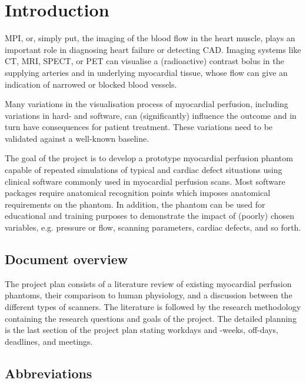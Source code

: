 \chapter{Introduction}
\label{ch:Intro}


\Ac{MPI}, or, simply put, the imaging of the blood flow in the heart muscle, plays an important role in diagnosing heart failure or detecting \ac{CAD}. Imaging systems like \ac{CT}, \ac{MRI}, \ac{SPECT}, or \ac{PET} can visualise a (radioactive) contrast bolus in the supplying arteries and in underlying myocardial tissue, whose flow can give an indication of narrowed or blocked blood vessels.

Many variations in the visualisation process of myocardial perfusion, including variations in hard- and software, can (significantly) influence the outcome and in turn have consequences for patient treatment. These variations need to be validated against a well-known baseline.

The goal of the project is to develop a prototype myocardial perfusion phantom capable of repeated simulations of typical and cardiac defect situations using clinical software commonly used in myocardial perfusion scans. Most software packages require anatomical recognition points which imposes anatomical requirements on the phantom. In addition, the phantom can be used for educational and training purposes to demonstrate the impact of (poorly) chosen variables, e.g. pressure or flow, scanning parameters, cardiac defects, and so forth.

\section*{Document overview}
\label{sec:doc_overview}
The project plan consists of a literature review of existing myocardial perfusion phantoms, their comparison to human physiology, and a discussion between the different types of scanners. The literature is followed by the research methodology containing the research questions and goals of the project. The detailed planning is the last section of the project plan stating workdays and -weeks, off-days, deadlines, and meetings.

\section*{Abbreviations}
\begin{multicols}{2}
	\printacronyms[include-classes=abbrev, name=Abbreviations, heading=none]
\end{multicols}